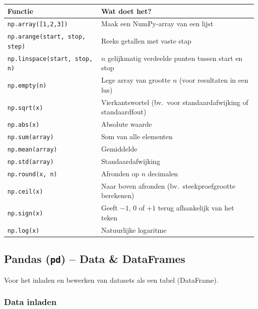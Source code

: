 \documentclass[a4paper,11pt]{article}
\begin{document}
\begin{center}
\renewcommand{\arraystretch}{1.3}
\begin{tabularx}{\linewidth}{@{}lX@{}}
\toprule
\textbf{Functie} & \textbf{Wat doet het?} \\
\midrule
\texttt{np.array([1,2,3])} & Maak een NumPy-array van een lijst \\
\texttt{np.arange(start, stop, step)} & Reeks getallen met vaste stap \\
\texttt{np.linspace(start, stop, n)} & $n$ gelijkmatig verdeelde punten tussen start en stop \\
\texttt{np.empty(n)} & Lege array van grootte $n$ (voor resultaten in een lus) \\
\texttt{np.sqrt(x)} & Vierkantswortel (bv.\ voor standaardafwijking of standaardfout) \\
\texttt{np.abs(x)} & Absolute waarde \\
\texttt{np.sum(array)} & Som van alle elementen \\
\texttt{np.mean(array)} & Gemiddelde \\
\texttt{np.std(array)} & Standaardafwijking \\
\texttt{np.round(x, n)} & Afronden op $n$ decimalen \\
\texttt{np.ceil(x)} & Naar boven afronden (bv.\ steekproefgrootte berekenen) \\
\texttt{np.sign(x)} & Geeft $-1$, $0$ of $+1$ terug afhankelijk van het teken \\
\texttt{np.log(x)} & Natuurlijke logaritme \\
\bottomrule
\end{tabularx}
\end{center}

\subsection{Pandas (\texttt{pd}) -- Data \& DataFrames}

Voor het inladen en bewerken van datasets als een tabel (DataFrame).

\subsubsection*{Data inladen}
\end{document}
